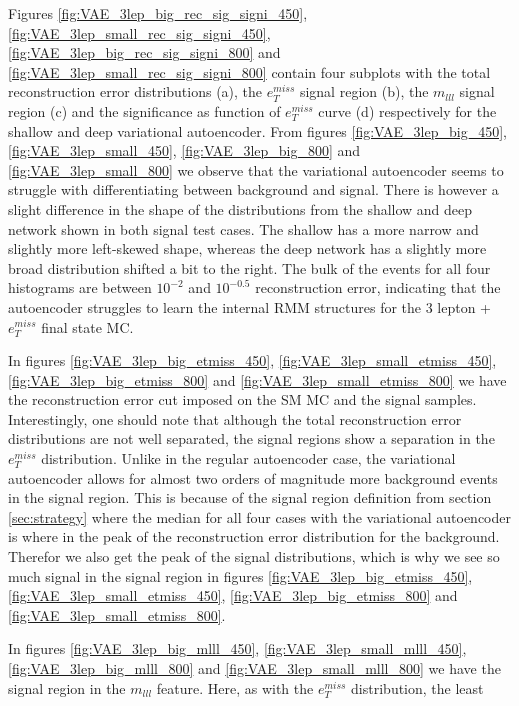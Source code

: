 Figures \ref{fig:VAE_3lep_big_rec_sig_signi_450}, \ref{fig:VAE_3lep_small_rec_sig_signi_450}, 
\ref{fig:VAE_3lep_big_rec_sig_signi_800} and \ref{fig:VAE_3lep_small_rec_sig_signi_800} contain four 
subplots with the total reconstruction error distributions (a), the $e_T^{miss}$ signal region (b), 
the $m_{lll}$ signal region (c) and the significance as function of $e_T^{miss}$ curve (d) respectively 
for the shallow and deep variational autoencoder. From figures \ref{fig:VAE_3lep_big_450}, \ref{fig:VAE_3lep_small_450},
\ref{fig:VAE_3lep_big_800} and \ref{fig:VAE_3lep_small_800} we observe that the variational 
autoencoder seems to struggle with differentiating between background and signal. 
There is however a slight difference in the shape of the distributions from the shallow and 
deep network shown in both signal test cases. The shallow has a more narrow and slightly more 
left-skewed shape, whereas the deep network has a slightly more broad distribution shifted a 
bit to the right. The bulk of the events for all four histograms are between $10^{-2}$ and $10^{-0.5}$ 
reconstruction error, indicating that the autoencoder struggles to learn the internal RMM 
structures for the 3 lepton + $e_T^{miss}$ final state MC. \par 
In figures \ref{fig:VAE_3lep_big_etmiss_450}, \ref{fig:VAE_3lep_small_etmiss_450}, 
\ref{fig:VAE_3lep_big_etmiss_800} and  \ref{fig:VAE_3lep_small_etmiss_800} we have the 
reconstruction error cut imposed on the SM MC and the signal samples. Interestingly, one should 
note that although the total reconstruction error distributions are not well separated, the 
signal regions show a separation in the $e_T^{miss}$ distribution. Unlike in the regular autoencoder 
case, the variational autoencoder allows for almost two orders of magnitude more background 
events in the signal region. This is because of the signal region definition from section 
\ref{sec:strategy} where the median for all four cases with the variational autoencoder is where in the peak of the 
reconstruction error distribution for the background. Therefor we also get the peak of 
the signal distributions, which is why we see so much signal in the signal region in figures 
\ref{fig:VAE_3lep_big_etmiss_450}, \ref{fig:VAE_3lep_small_etmiss_450}, 
\ref{fig:VAE_3lep_big_etmiss_800} and \ref{fig:VAE_3lep_small_etmiss_800}. \par 
In figures \ref{fig:VAE_3lep_big_mlll_450}, \ref{fig:VAE_3lep_small_mlll_450}, 
\ref{fig:VAE_3lep_big_mlll_800} and  \ref{fig:VAE_3lep_small_mlll_800} we have the signal 
region in the $m_{lll}$ feature. Here, as with the $e_T^{miss}$ distribution, the least 
